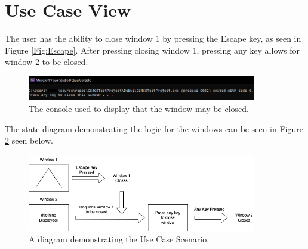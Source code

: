 \section{Use Case View}
\label{section:useCaseView}

The user has the ability to close window 1 by pressing the Escape key, as seen in Figure \ref{Fig:Escape}.
After pressing closing window 1, pressing any key allows for window 2 to be closed.

\begin{figure}[htb]
    \centering
    \includegraphics[width=10cm]{./Images/Console.png}
       \caption{The console used to display that the window may be closed.}
           \label{Fig:Console}
\end{figure}

The state diagram demonstrating the logic for the windows can be seen in Figure \ref{Fig:UseCaseScenario} seen below.

\begin{figure}[htb]
    \centering
    \includegraphics[width=10cm]{./Images/UseCaseView.png}
       \caption{A diagram demonstrating the Use Case Scenario.}
           \label{Fig:UseCaseScenario}
\end{figure}